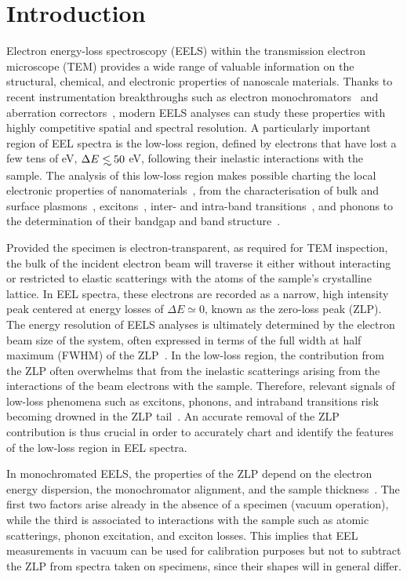 \section{Introduction}
\label{sec:introduction}

Electron energy-loss spectroscopy (EELS) within the transmission electron microscope (TEM) provides
a wide range of
valuable information on the structural, chemical, and electronic properties of nanoscale materials.
%
Thanks to recent instrumentation breakthroughs
such as electron monochromators~\cite{Terauchi:2005, Freitag:2005} and aberration correctors~\cite{Haider:1998},
modern EELS analyses can study these properties with highly competitive spatial and spectral resolution.
%
A particularly important region of EEL spectra is
the low-loss region, defined by electrons that have lost a few tens of eV,
$\Delta E\lsim 50$ eV,
following their inelastic interactions with the sample.
%
The analysis of this low-loss region makes possible charting the local
electronic properties of nanomaterials~\cite{Geiger:1967}, from the characterisation of
bulk and surface plasmons~\cite{Schaffer:2008}, excitons~\cite{Erni:2005}, 
inter- and intra-band transitions~\cite{Rafferty:1998},
and phonons to the determination of their bandgap and band structure~\cite{Stoger:2008}.

Provided the specimen is electron-transparent, as required for TEM inspection,
the bulk of the incident electron beam will traverse it
either without interacting or restricted to elastic scatterings with the atoms
of the sample's crystalline lattice.
%
In EEL spectra, these electrons are recorded as a narrow,
high intensity peak centered at energy losses
of $\Delta E\simeq 0$, known as the zero-loss peak (ZLP).
%
The energy resolution of EELS analyses is ultimately determined by
the electron beam size of the system, often expressed in terms
of the full width at half maximum (FWHM) of the
ZLP~\cite{Egerton:2009}.
%
In the low-loss region, the contribution from the ZLP
often overwhelms that from the inelastic scatterings arising from
the interactions of the beam electrons with the sample.
%
Therefore, relevant signals of low-loss phenomena such as excitons,
phonons, and intraband transitions risk becoming drowned
in the ZLP tail~\cite{Abajo:2010}.
%
An accurate removal of the ZLP
contribution is thus crucial in order to accurately chart and identify the features
of the low-loss region in EEL spectra.


In monochromated EELS, the properties of the ZLP depend on the electron energy dispersion,
the monochromator alignment, and the sample thickness~\cite{Park:2008, Stoger:2008}.
%
The first two factors arise already in the absence of a specimen (vacuum operation),
while the third is associated
to interactions with the sample such as atomic scatterings,
phonon excitation, and exciton losses.
%
This implies that EEL measurements in vacuum can be used for calibration purposes
but not to subtract the ZLP from spectra taken on specimens, since their shapes will
in general differ.




